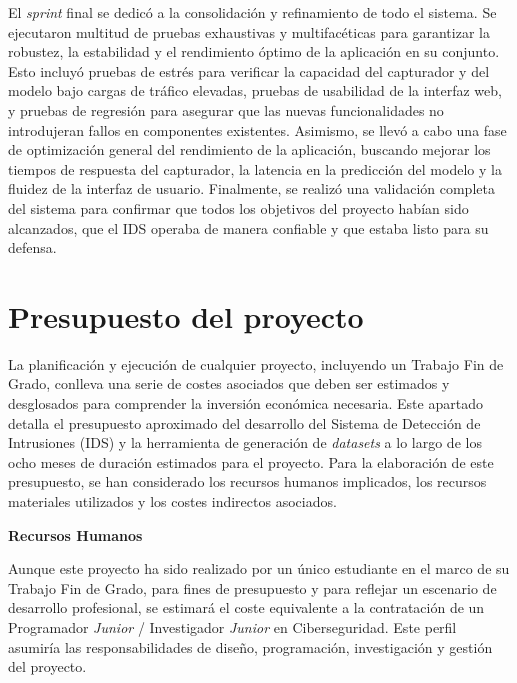 El \textit{sprint} final se dedicó a la consolidación y refinamiento de todo el sistema. Se ejecutaron multitud de pruebas exhaustivas y multifacéticas para garantizar la robustez, la estabilidad y el rendimiento óptimo de la aplicación en su conjunto. Esto incluyó pruebas de estrés para verificar la capacidad del capturador y del modelo bajo cargas de tráfico elevadas, pruebas de usabilidad de la interfaz web, y pruebas de regresión para asegurar que las nuevas funcionalidades no introdujeran fallos en componentes existentes. Asimismo, se llevó a cabo una fase de optimización general del rendimiento de la aplicación, buscando mejorar los tiempos de respuesta del capturador, la latencia en la predicción del modelo y la fluidez de la interfaz de usuario. Finalmente, se realizó una validación completa del sistema \cite{NIST2020SP800-115} para confirmar que todos los objetivos del proyecto habían sido alcanzados, que el IDS operaba de manera confiable y que estaba listo para su defensa.

\section{Presupuesto del proyecto}

La planificación y ejecución de cualquier proyecto, incluyendo un Trabajo Fin de Grado, conlleva una serie de costes asociados que deben ser estimados y desglosados para comprender la inversión económica necesaria. Este apartado detalla el presupuesto aproximado del desarrollo del Sistema de Detección de Intrusiones (IDS) y la herramienta de generación de \textit{datasets} a lo largo de los ocho meses de duración estimados para el proyecto. Para la elaboración de este presupuesto, se han considerado los recursos humanos implicados, los recursos materiales utilizados y los costes indirectos asociados.

\textbf{Recursos Humanos}

Aunque este proyecto ha sido realizado por un único estudiante en el marco de su Trabajo Fin de Grado, para fines de presupuesto y para reflejar un escenario de desarrollo profesional, se estimará el coste equivalente a la contratación de un Programador \textit{Junior} / Investigador \textit{Junior} en Ciberseguridad. Este perfil asumiría las responsabilidades de diseño, programación, investigación y gestión del proyecto.

